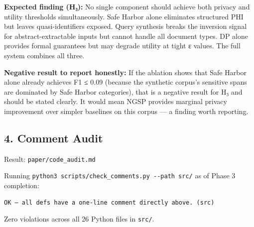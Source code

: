 \textbf{Expected finding (H₃):} No single component should achieve both
privacy and utility thresholds simultaneously. Safe Harbor alone
eliminates structured PHI but leaves quasi-identifiers exposed. Query
synthesis breaks the inversion signal for abstract-extractable inputs
but cannot handle all document types. DP alone provides formal
guarantees but may degrade utility at tight ε values. The full system
combines all three.

\textbf{Negative result to report honestly:} If the ablation shows that
Safe Harbor alone already achieves F1 ≤ 0.09 (because the synthetic
corpus's sensitive spans are dominated by Safe Harbor categories), that
is a negative result for H₃ and should be stated clearly. It would mean
NGSP provides marginal privacy improvement over simpler baselines on
this corpus --- a finding worth reporting.

\subsection{4. Comment Audit}\label{comment-audit}

Result: \texttt{paper/code\_audit.md}

Running \texttt{python3\ scripts/check\_comments.py\ -\/-path\ src/} as
of Phase 3 completion:

\begin{verbatim}
OK — all defs have a one-line comment directly above. (src)
\end{verbatim}

Zero violations across all 26 Python files in \texttt{src/}.
